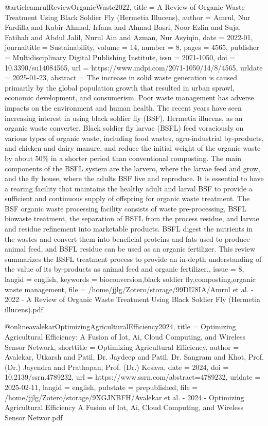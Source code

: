 {{{@article{amrulReviewOrganicWaste2022,
  title = {A {{Review}} of {{Organic Waste Treatment Using Black Soldier Fly}} ({{Hermetia}} Illucens)},
  author = {Amrul, Nur Fardilla and Kabir Ahmad, Irfana and Ahmad Basri, Noor Ezlin and Suja, Fatihah and Abdul Jalil, Nurul Ain and Azman, Nur Asyiqin},
  date = {2022-01},
  journaltitle = {Sustainability},
  volume = {14},
  number = {8},
  pages = {4565},
  publisher = {Multidisciplinary Digital Publishing Institute},
  issn = {2071-1050},
  doi = {10.3390/su14084565},
  url = {https://www.mdpi.com/2071-1050/14/8/4565},
  urldate = {2025-01-23},
  abstract = {The increase in solid waste generation is caused primarily by the global population growth that resulted in urban sprawl, economic development, and consumerism. Poor waste management has adverse impacts on the environment and human health. The recent years have seen increasing interest in using black soldier fly (BSF), Hermetia illucens, as an organic waste converter. Black soldier fly larvae (BSFL) feed voraciously on various types of organic waste, including food wastes, agro-industrial by-products, and chicken and dairy manure, and reduce the initial weight of the organic waste by about 50\% in a shorter period than conventional composting. The main components of the BSFL system are the larvero, where the larvae feed and grow, and the fly house, where the adults BSF live and reproduce. It is essential to have a rearing facility that maintains the healthy adult and larval BSF to provide a sufficient and continuous supply of offspring for organic waste treatment. The BSF organic waste processing facility consists of waste pre-processing, BSFL biowaste treatment, the separation of BSFL from the process residue, and larvae and residue refinement into marketable products. BSFL digest the nutrients in the wastes and convert them into beneficial proteins and fats used to produce animal feed, and BSFL residue can be used as an organic fertilizer. This review summarizes the BSFL treatment process to provide an in-depth understanding of the value of its by-products as animal feed and organic fertilizer.},
  issue = {8},
  langid = {english},
  keywords = {bioconversion,black soldier fly,composting,organic waste management},
  file = {/home/jjlg/Zotero/storage/99DI78IA/Amrul et al. - 2022 - A Review of Organic Waste Treatment Using Black Soldier Fly (Hermetia illucens).pdf}
}

@online{avalekarOptimizingAgriculturalEfficiency2024,
  title = {Optimizing {{Agricultural Efficiency}}: {{A Fusion}} of {{Iot}}, {{Ai}}, {{Cloud Computing}}, and {{Wireless Sensor Network}}},
  shorttitle = {Optimizing {{Agricultural Efficiency}}},
  author = {Avalekar, Utkarsh and Patil, Dr. Jaydeep and Patil, Dr. Sangram and Khot, Prof. (Dr.) Jayendra and Prathapan, Prof. (Dr.) Kesava},
  date = {2024},
  doi = {10.2139/ssrn.4789232},
  url = {https://www.ssrn.com/abstract=4789232},
  urldate = {2025-02-11},
  langid = {english},
  pubstate = {prepublished},
  file = {/home/jjlg/Zotero/storage/9XGJNBFH/Avalekar et al. - 2024 - Optimizing Agricultural Efficiency A Fusion of Iot, Ai, Cloud Computing, and Wireless Sensor Networ.pdf}
}

}}}
